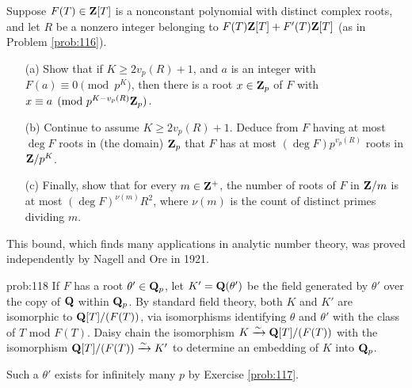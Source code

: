 \begin{challenge} Suppose $F(T) \in \mathbf{Z}[T]$ is a nonconstant polynomial with distinct complex roots, and let $R$ be a nonzero integer belonging to $F(T) \mathbf{Z}[T] + F'(T) \mathbf{Z}[T]$ (as in Problem \ref{prob:116}). 
\begin{enumerate}
\vspace{-0.12in}
\item[(a)] Show that if $K\ge 2 v_p(R)+1$, and $a$ is an integer with $F(a)\equiv 0\pmod{p^{K}}$, then there is a root $x \in \mathbf{Z}_p$ of $F$ with $x\equiv a\pmod{p^{K-v_p(R)}\mathbf{Z}_p}$.
\item[(b)] Continue to assume $K\ge 2 v_p(R)+1$. Deduce from $F$ having at most $\deg{F}$ roots in (the  domain) $\mathbf{Z}_p$ that $F$ has at most $(\deg{F})p^{v_p(R)}$ roots in $\mathbf{Z}/p^K$.
\item[(c)] Finally, show that for every $m\in\mathbf{Z}^{+}$, the number of roots of $F$ in $\mathbf{Z}/m$ is at most $(\deg{F})^{\nu(m)} R^2$, where $\nu(m)$ is the count of distinct primes dividing $m$.
\end{enumerate}
\vspace{-0.11in}
This bound, which finds many applications in analytic number theory, was proved independently by Nagell \cite{nagell} and Ore \cite{ore} in 1921.
\end{challenge}

\begin{sol}{prob:118} If $F$ has a root $\theta' \in \mathbf{Q}_p$, let $K' = \mathbf{Q}(\theta')$ be the field generated by $\theta'$ over the copy of $\mathbf{Q}$ within $\mathbf{Q}_p$. By standard field theory, both $K$ and $K'$ are isomorphic to $\mathbf{Q}[T]/(F(T))$, via isomorphisms identifying $\theta$ and $\theta'$ with the class of $T$ mod $F(T)$. Daisy chain the isomorphism $K \xrightarrow[]{\sim} \mathbf{Q}[T]/(F(T))$ with the isomorphism $\mathbf{Q}[T]/(F(T)) \xrightarrow[]{\sim} K'$ to determine an embedding of $K$ into $\mathbf{Q}_p$. 

Such a $\theta'$ exists for infinitely many $p$ by Exercise \ref{prob:117}.
\end{sol}

